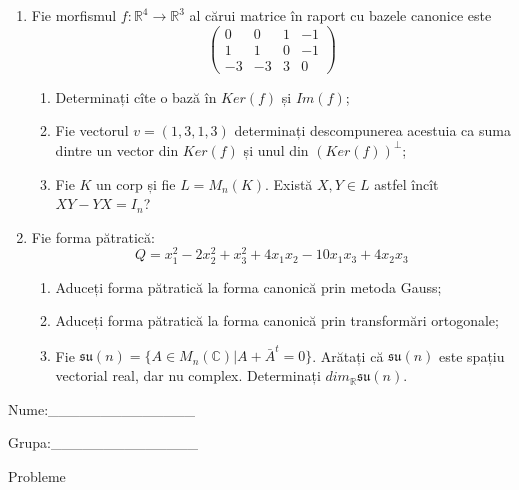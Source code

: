 \documentclass{article}
\begin{document}
\begin{enumerate}
 \item Fie morfismul $f:\mathbb{R}^4 \to \mathbb{R}^3$ al cărui matrice în raport cu bazele canonice este
$$\begin{pmatrix}
0&0&1&-1\\
1&1&0&-1\\
-3&-3&3&0
\end{pmatrix}$$

\begin{enumerate}
\item Determinați cîte o bază în $Ker(f)$ și $Im(f)$;
\item Fie vectorul $v=(1,3,1,3)$ determinați descompunerea acestuia ca suma dintre un vector din $Ker(f)$ și unul din $(Ker(f))^\perp$;
\item Fie $K$ un corp și fie $L=M_n(K)$. Există $X,Y \in L$ astfel încît $XY-YX=I_n$?  
\end{enumerate}
\item Fie forma pătratică:
$$Q= x_1^2-2x_2^2+x_3^2+4x_1x_2-10x_1x_3+4x_2x_3$$

\begin{enumerate}
\item Aduceți forma pătratică la forma canonică prin metoda Gauss;
\item Aduceți forma pătratică la forma canonică prin transformări ortogonale;
\item Fie $\mathfrak{su}(n)=\{ A \in M_n(\mathbb{C}) | A+\bar{A}^t=0\}$. Arătați că $\mathfrak{su}(n)$ este spațiu vectorial real, dar nu complex.
Determinați $dim_{\mathbb{R}}\mathfrak{su}(n)$.
\end{enumerate}
\end{enumerate}
\newpage
\begin{flushright}
Nume:\_\_\_\_\_\_\_\_\_\_\_\_\_\_
 
 
Grupa:\_\_\_\_\_\_\_\_\_\_\_\_\_\_
\end{flushright}
\begin{center}
\vspace{2cm}
{\Large Probleme}
\vspace{2cm}
\end{center}
\end{document}
